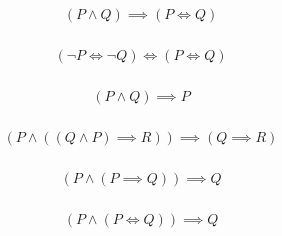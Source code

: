 \begin{prop}
\label{Proposition:land_implies_iff}
\begin{align*}
(P \land Q) \implies  (P \iff Q) \\
\end{align*}
\end{prop}

\begin{prop}
\label{Proposition:iff_contrapositive}
\begin{align*}
(\lnot P \iff \lnot Q) \iff (P \iff Q) \\
\end{align*}
\end{prop}

\begin{prop}
\label{Proposition:land_omit}
\begin{align*}
(P \land Q) \implies P \\
\end{align*}
\end{prop}

\begin{lemma}
\label{Lemma:uniqueness}
\begin{align*}
(P \land ((Q \land P) \implies R)) \implies (Q \implies R) \\
\end{align*}
\end{lemma}

\begin{prop}
\label{Proposition:implies_satisfy}
\begin{align*}
(P \land (P \implies Q)) \implies Q \\
\end{align*}
\end{prop}

\begin{prop}
\label{Proposition:iff_satisfy}
\begin{align*}
(P \land (P \iff Q)) \implies Q \\
\end{align*}
\end{prop}
